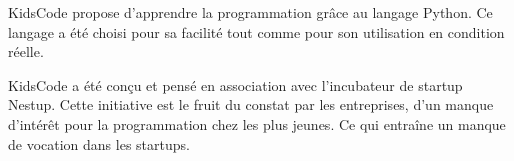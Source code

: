 KidsCode propose d'apprendre la programmation grâce au langage Python. Ce langage a été choisi pour sa facilité tout comme pour son utilisation en condition réelle. 

KidsCode a été conçu et pensé en association avec l'incubateur de startup Nestup. Cette initiative est le fruit du constat par les entreprises, d'un manque d'intérêt pour la programmation chez les plus jeunes. Ce qui entraîne un manque de vocation dans les startups.
